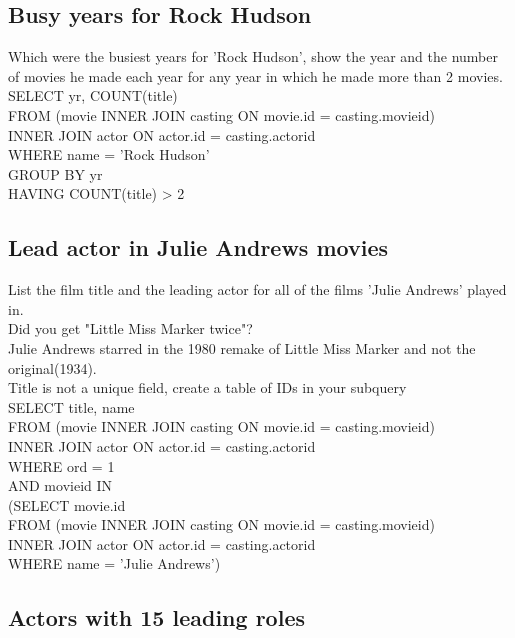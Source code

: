 \documentclass[10pt, oneside]{article}
\begin{document}
\subsection{Busy years for Rock Hudson}

Which were the busiest years for 'Rock Hudson', show the year and the number of movies he made each year for any year in which he made more than 2 movies.\\

SELECT yr, COUNT(title)\\
FROM (movie INNER JOIN casting ON movie.id = casting.movieid)\\ 
INNER JOIN actor ON actor.id = casting.actorid\\
WHERE name = 'Rock Hudson'\\
GROUP BY yr\\
HAVING COUNT(title) > 2\\

\subsection{Lead actor in Julie Andrews movies}

List the film title and the leading actor for all of the films 'Julie Andrews' played in.\\

Did you get "Little Miss Marker twice"?\\
Julie Andrews starred in the 1980 remake of Little Miss Marker and not the original(1934).\\

Title is not a unique field, create a table of IDs   \color{red}in your subquery\color{black}\\

SELECT title, name\\
FROM (movie INNER JOIN casting ON movie.id = casting.movieid) \\
INNER JOIN actor ON actor.id = casting.actorid\\
WHERE ord = 1 \\
AND movieid IN \\
(SELECT movie.id \\
FROM (movie INNER JOIN casting ON movie.id = casting.movieid) \\
INNER JOIN actor ON actor.id = casting.actorid\\
WHERE name = 'Julie Andrews')\\

\subsection{Actors with 15 leading roles}
\end{document}
